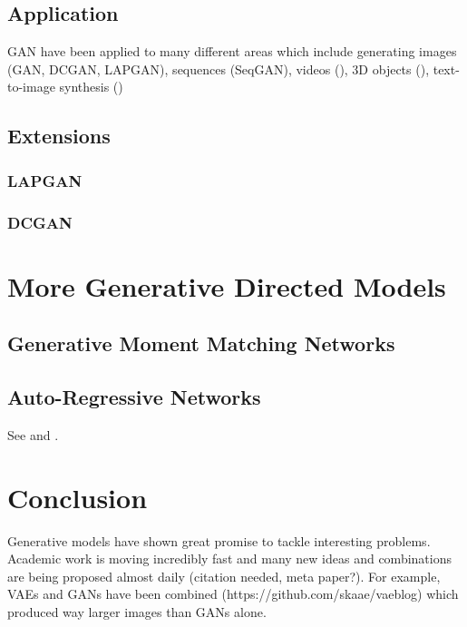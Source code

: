 \documentclass[twoside,11pt,a4paper]{article}
\theoremstyle{break}
\begin{document}
\subsection{Application}
\label{sub:gan_application}
GAN have been applied to many different areas which include generating images (GAN, DCGAN, LAPGAN), sequences (SeqGAN), videos (\cite{gan_video:2016}), 3D objects (\cite{gan_3d:2016}), text-to-image synthesis (\cite{gan_t2i:2016})
\subsection{Extensions}
\label{sub:gan_extensions}

\subsubsection{LAPGAN}
\label{ssub:lapgan}

\subsubsection{DCGAN}
\label{ssub:dcgan}





\section{More Generative Directed Models}
\label{sec:more}

\subsection{Generative Moment Matching Networks}
\label{sub:more_mmn}

\subsection{Auto-Regressive Networks}
\label{sub:more_arn}

See \cite{gan_openai:2016} and \cite{gan_training:2016}.


\section{Conclusion}
\label{sec:conclusion}

Generative models have shown great promise to tackle interesting problems.
Academic work is moving incredibly fast and many new ideas and combinations
are being proposed almost daily (citation needed, meta paper?).
For example, VAEs and GANs have been combined (https://github.com/skaae/vaeblog)
which produced way larger images than GANs alone.
\end{document}
